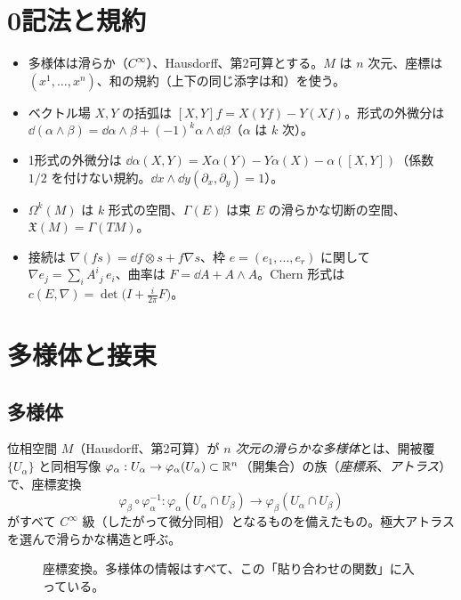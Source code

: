 \section*{0\quad 記法と規約}
\begin{itemize}
\item 多様体は滑らか（$C^\infty$）、Hausdorff、第2可算とする。$M$ は $n$ 次元、座標は $(x^1,\dots,x^n)$、和の規約（上下の同じ添字は和）を使う。
\item ベクトル場 $X,Y$ の括弧は $[X,Y]f=X(Yf)-Y(Xf)$。形式の外微分は $\dd(\alpha\wedge\beta)=\dd\alpha\wedge\beta+(-1)^{k}\alpha\wedge\dd\beta$（$\alpha$ は $k$ 次）。
\item 1形式の外微分は $\dd\alpha(X,Y)=X\alpha(Y)-Y\alpha(X)-\alpha([X,Y])$（係数 $1/2$ を付けない規約。$\dd x\wedge\dd y(\partial_x,\partial_y)=1$）。
\item $\Omega^k(M)$ は $k$ 形式の空間、$\Gamma(E)$ は束 $E$ の滑らかな切断の空間、$\mathfrak X(M)=\Gamma(TM)$。
\item 接続は $\nabla(fs)=\dd f\otimes s+f\nabla s$、枠 $e=(e_1,\dots,e_r)$ に関して $\nabla e_j=\sum_i A^i{}_j\,e_i$、曲率は $F=\dd A+A\wedge A$。Chern 形式は $c(E,\nabla)=\det\bigl(I+\tfrac{i}{2\pi}F\bigr)$。
\end{itemize}

\section{多様体と接束}
\subsection{多様体}
\begin{defn}[滑らかな多様体]
位相空間 $M$（Hausdorff、第2可算）が \emph{$n$ 次元の滑らかな多様体}とは、開被覆 $\{U_\alpha\}$ と同相写像 $\varphi_\alpha:U_\alpha\to\varphi_\alpha(U_\alpha)\subset\mathbb R^n$（開集合）の族（\emph{座標系}、\emph{アトラス}）で、座標変換
\[
\varphi_\beta\circ\varphi_\alpha^{-1}:\varphi_\alpha(U_\alpha\cap U_\beta)\to\varphi_\beta(U_\alpha\cap U_\beta)
\]
がすべて $C^\infty$ 級（したがって微分同相）となるものを備えたもの。極大アトラスを選んで滑らかな構造と呼ぶ。
\end{defn}

\begin{figure}[h]
\centering
{}
\caption{座標変換。多様体の情報はすべて、この「貼り合わせの関数」に入っている。}
\end{figure}

